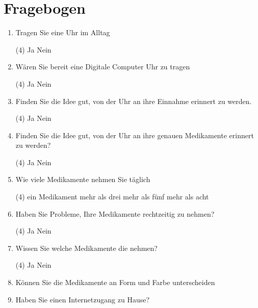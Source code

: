 %


\section{Fragebogen}
\begin{enumerate}
\item Tragen Sie eine Uhr im Alltag
\begin{tasks}(4)
\task Ja
\task Nein
\end{tasks}
\item Wären Sie bereit eine Digitale Computer Uhr zu tragen
\begin{tasks}(4)
\task Ja
\task Nein
\end{tasks}
\item Finden Sie die Idee gut, von der Uhr an ihre Einnahme erinnert zu werden.
\begin{tasks}(4)
\task Ja
\task Nein
\end{tasks}
\item Finden Sie die Idee gut, von der Uhr an ihre genauen Medikamente erinnert zu werden?
\begin{tasks}(4)
\task Ja
\task Nein
\end{tasks}
\item Wie viele Medikamente nehmen Sie täglich
\begin{tasks}(4)
\task ein Medikament
\task mehr als drei
\task mehr als fünf
\task mehr als acht
\end{tasks}
\item Haben Sie Probleme, Ihre Medikamente rechtzeitig zu nehmen?
\begin{tasks}(4)
\task Ja
\task Nein
\end{tasks}
\item Wissen Sie welche Medikamente die nehmen?
\begin{tasks}(4)
\task Ja
\task Nein
\end{tasks}
\item Können Sie die Medikamente an Form und Farbe unterscheiden
\item Haben Sie einen Internetzugang zu Hause?

\end{enumerate}
